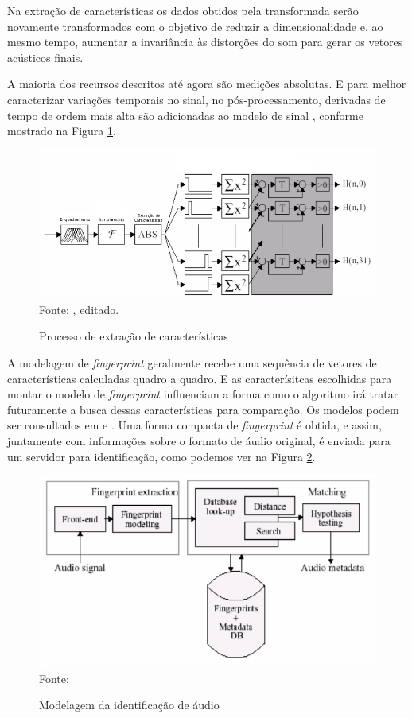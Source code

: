 Na extração de características os dados obtidos pela transformada serão novamente transformados com o objetivo de reduzir a dimensionalidade e, ao mesmo tempo, aumentar a invariância às distorções do som para gerar os vetores acústicos finais.

A maioria dos recursos descritos até agora são medições absolutas. E para melhor caracterizar variações temporais no sinal, no pós-processamento, derivadas de tempo de ordem mais alta são adicionadas ao modelo de sinal \cite{cano2005}, conforme mostrado na Figura \ref{fig:extCaract}.

\begin{figure}[!htb]
   \centering
   \caption{Processo de extração de características}\label{fig:extCaract} 
   \includegraphics[scale=0.47]{figuras/extCaract.png}
   \\Fonte: \cite{haitsma2002}, editado.
\end{figure}

A modelagem de \textit{fingerprint} geralmente recebe uma sequência de vetores de características calculadas quadro a quadro. E as caracterísitcas escolhidas para montar o modelo de \textit{fingerprint} influenciam a forma como o algoritmo irá tratar futuramente a busca dessas características para comparação. Os modelos podem ser consultados em \cite{cano2005} e \cite{haitsma2002}. Uma forma compacta de \textit{fingerprint} é obtida, e assim, juntamente com informações sobre o formato de áudio original, é enviada para um servidor para identificação, como podemos ver na Figura \ref{fig:identAudio}.

\begin{figure}[!htb]
   \centering
   \caption{Modelagem da identificação de áudio}\label{fig:identAudio} 
   \includegraphics[scale=0.62]{figuras/etapasFinger2.png}
   \\Fonte: \cite{henriques2003}
\end{figure}

